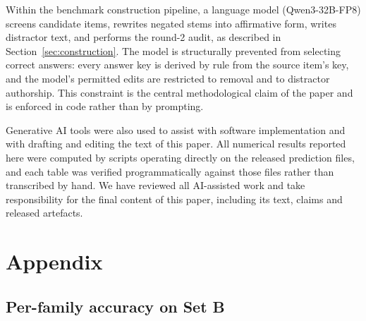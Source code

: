 \documentclass{article} %
\begin{document}
Within the benchmark construction pipeline, a language model (Qwen3-32B-FP8) screens
candidate items, rewrites negated stems into affirmative form, writes distractor text, and
performs the round-2 audit, as described in Section~\ref{sec:construction}. The model is
structurally prevented from selecting correct answers: every answer key is derived by rule
from the source item's key, and the model's permitted edits are restricted to removal and
to distractor authorship. This constraint is the central methodological claim of the paper
and is enforced in code rather than by prompting.

Generative AI tools were also used to assist with software implementation and with drafting
and editing the text of this paper. All numerical results reported here were computed by
scripts operating directly on the released prediction files, and each table was verified
programmatically against those files rather than transcribed by hand. We have reviewed all
AI-assisted work and take responsibility for the final content of this paper, including its
text, claims and released artefacts.




\appendix
\section{Appendix}

\subsection{Per-family accuracy on Set B}
\end{document}
